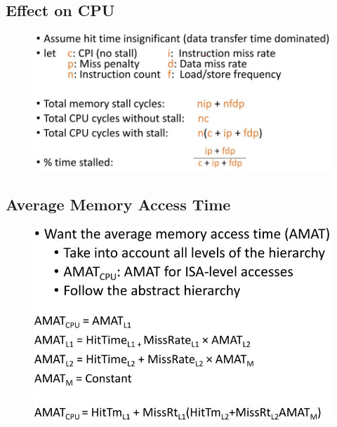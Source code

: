 \documentclass[10pt,a4paper]{article}
\begin{document}
\pagebreak

\subsection{Effect on CPU}

\begin{figure} [h!]
    \centering
    \includegraphics[scale=0.5]{A.JPG}
\end{figure}

\subsection{Average Memory Access Time}

\begin{figure} [h!]
    \centering
    \includegraphics[scale=0.5]{B.JPG}
\end{figure}

\pagebreak
\end{document}
